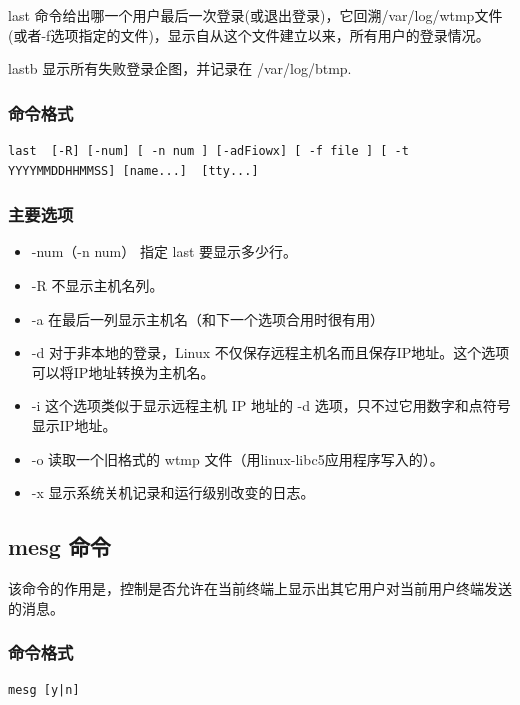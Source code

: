 last
命令给出哪一个用户最后一次登录(或退出登录)，它回溯/var/log/wtmp文件(或者-f选项指定的文件)，显示自从这个文件建立以来，所有用户的登录情况。

lastb 显示所有失败登录企图，并记录在 /var/log/btmp.

\subsubsection{命令格式}

{\begin{shaded}\begin{verbatim}
last  [-R] [-num] [ -n num ] [-adFiowx] [ -f file ] [ -t YYYYMMDDHHMMSS] [name...]  [tty...]
\end{verbatim}\end{shaded}}
\subsubsection{主要选项}

\begin{itemize}
\item
  -num（-n num） 指定 last 要显示多少行。
\item
  -R 不显示主机名列。
\item
  -a 在最后一列显示主机名（和下一个选项合用时很有用）
\item
  -d 对于非本地的登录，Linux
  不仅保存远程主机名而且保存IP地址。这个选项可以将IP地址转换为主机名。
\item
  -i 这个选项类似于显示远程主机 IP 地址的 -d
  选项，只不过它用数字和点符号显示IP地址。
\item
  -o 读取一个旧格式的 wtmp 文件（用linux-libc5应用程序写入的）。
\item
  -x 显示系统关机记录和运行级别改变的日志。
\end{itemize}
\subsection{mesg 命令}

该命令的作用是，控制是否允许在当前终端上显示出其它用户对当前用户终端发送的消息。

\subsubsection{命令格式}

{\begin{shaded}\begin{verbatim}
mesg [y|n]
\end{verbatim}\end{shaded}}
